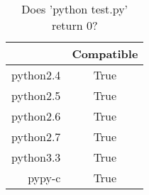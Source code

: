 \begin{table}[ht]
	\begin{center}
	\caption{Does 'python test.py' return 0?}
	\label{tab:compatibleTable}
		\begin{tabular}{rc}
		\toprule
			 & Compatible\\
			\midrule
			python2.4 & True\\
			python2.5 & True\\
			python2.6 & True\\
			python2.7 & True\\
			python3.3 & True\\
			pypy-c & True\\
		\bottomrule
		\end{tabular}
	\end{center}
\end{table}